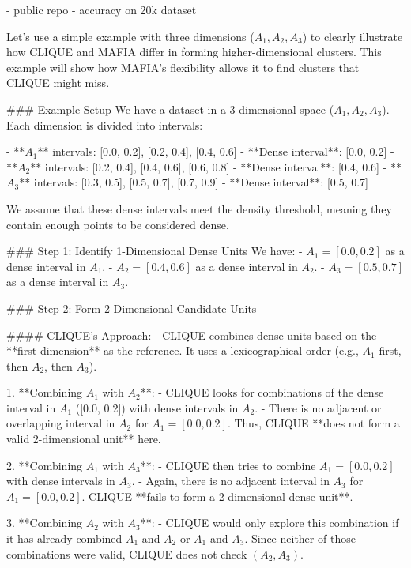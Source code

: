 - public repo
- accuracy on 20k dataset




Let's use a simple example with three dimensions (\( A_1, A_2, A_3 \)) to clearly illustrate how CLIQUE and MAFIA differ in forming higher-dimensional clusters. This example will show how MAFIA's flexibility allows it to find clusters that CLIQUE might miss.

### Example Setup
We have a dataset in a 3-dimensional space (\( A_1, A_2, A_3 \)). Each dimension is divided into intervals:

- **\( A_1 \)** intervals: [0.0, 0.2], [0.2, 0.4], [0.4, 0.6]
  - **Dense interval**: [0.0, 0.2]
- **\( A_2 \)** intervals: [0.2, 0.4], [0.4, 0.6], [0.6, 0.8]
  - **Dense interval**: [0.4, 0.6]
- **\( A_3 \)** intervals: [0.3, 0.5], [0.5, 0.7], [0.7, 0.9]
  - **Dense interval**: [0.5, 0.7]

We assume that these dense intervals meet the density threshold, meaning they contain enough points to be considered dense.

### Step 1: Identify 1-Dimensional Dense Units
We have:
- \( A_1 = [0.0, 0.2] \) as a dense interval in \( A_1 \).
- \( A_2 = [0.4, 0.6] \) as a dense interval in \( A_2 \).
- \( A_3 = [0.5, 0.7] \) as a dense interval in \( A_3 \).

### Step 2: Form 2-Dimensional Candidate Units

#### CLIQUE’s Approach:
- CLIQUE combines dense units based on the **first dimension** as the reference. It uses a lexicographical order (e.g., \( A_1 \) first, then \( A_2 \), then \( A_3 \)).

1. **Combining \( A_1 \) with \( A_2 \)**:
   - CLIQUE looks for combinations of the dense interval in \( A_1 \) ([0.0, 0.2]) with dense intervals in \( A_2 \).
   - There is no adjacent or overlapping interval in \( A_2 \) for \( A_1 = [0.0, 0.2] \). Thus, CLIQUE **does not form a valid 2-dimensional unit** here.

2. **Combining \( A_1 \) with \( A_3 \)**:
   - CLIQUE then tries to combine \( A_1 = [0.0, 0.2] \) with dense intervals in \( A_3 \).
   - Again, there is no adjacent interval in \( A_3 \) for \( A_1 = [0.0, 0.2] \). CLIQUE **fails to form a 2-dimensional dense unit**.

3. **Combining \( A_2 \) with \( A_3 \)**:
   - CLIQUE would only explore this combination if it has already combined \( A_1 \) and \( A_2 \) or \( A_1 \) and \( A_3 \). Since neither of those combinations were valid, CLIQUE does not check \( (A_2, A_3) \).

